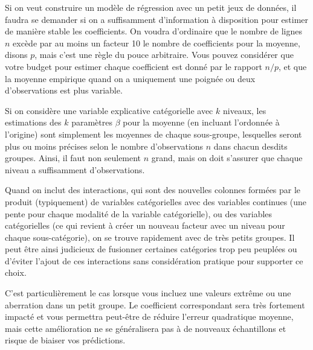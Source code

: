 \documentclass[
  11pt,
  letterpaper,
]{scrbook}
\theoremstyle{definition}
\theoremstyle{remark}
\begin{document}
Si on veut construire un modèle de régression avec un petit jeux de
données, il faudra se demander si on a suffisamment d'information à
disposition pour estimer de manière stable les coefficients. On voudra
d'ordinaire que le nombre de lignes \(n\) excède par au moins un facteur
10 le nombre de coefficients pour la moyenne, disons \(p\), mais c'est
une règle du pouce arbitraire. Vous pouvez considérer que votre budget
pour estimer chaque coefficient est donné par le rapport \(n/p\), et que
la moyenne empirique quand on a uniquement une poignée ou deux
d'observations est plus variable.

Si on considère une variable explicative catégorielle avec \(k\)
niveaux, les estimations des \(k\) paramètres \(\beta\) pour la moyenne
(en incluant l'ordonnée à l'origine) sont simplement les moyennes de
chaque sous-groupe, lesquelles seront plus ou moins précises selon le
nombre d'observations \(n\) dans chacun desdits groupes. Ainsi, il faut
non seulement \(n\) grand, mais on doit s'assurer que chaque niveau a
suffisamment d'observations.

Quand on inclut des interactions, qui sont des nouvelles colonnes
formées par le produit (typiquement) de variables catégorielles avec des
variables continues (une pente pour chaque modalité de la variable
catégorielle), ou des variables catégorielles (ce qui revient à créer un
nouveau facteur avec un niveau pour chaque sous-catégorie), on se trouve
rapidement avec de très petits groupes. Il peut être ainsi judicieux de
fusionner certaines catégories trop peu peuplées ou d'éviter l'ajout de
ces interactions sans considération pratique pour supporter ce choix.

C'est particulièrement le cas lorsque vous incluez une valeurs extrême
ou une aberration dans un petit groupe. Le coefficient correspondant
sera très fortement impacté et vous permettra peut-être de réduire
l'erreur quadratique moyenne, mais cette amélioration ne se généralisera
pas à de nouveaux échantillons et risque de biaiser vos prédictions.


\backmatter
\end{document}
